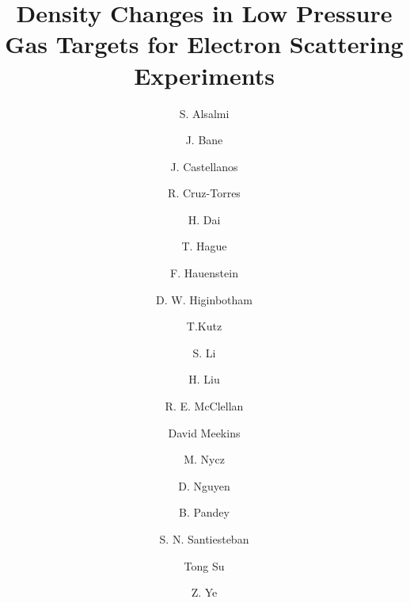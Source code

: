 \documentclass[final,5p,times,twocolumn,balance]{elsarticle}
\begin{document}
\begin{frontmatter}



\title{Density Changes in Low Pressure Gas Targets for Electron Scattering Experiments}

\author[Kent]{S. Alsalmi}
\author[TN]{J. Bane}
\author[FI]{J. Castellanos}
 \author[MIT]{R. Cruz-Torres}
\author[VT]{H. Dai}
\author[Kent]{T. Hague}
\author[OD]{F. Hauenstein}
\author[OD]{D. W. Higinbotham}
\author[SB]{T.Kutz}
\author[UNH]{S. Li}
\author[COL]{H. Liu}
\author[JLab]{R. E. McClellan}
\author[JLab]{David Meekins}
\author[Kent]{M. Nycz}
\author[UVa]{ D. Nguyen}
\author[hampton]{B. Pandey}
\author[UNH]{S. N. Santiesteban}
\author[Kent]{Tong Su}
\author[argonne]{ Z. Ye}


\address[Kent]{Kent State University, Kent, OH 44240}
\address[TN]{The University of Tennessee, Knoxville, Tennessee 37996, USA}
\address[FI]{Florida International University, Miami, FL
33199}
\address[MIT]{Massachusetts Institute of Technology, Cambridge, Massachusetts 02139, USA}
\address[UNH]{University of New Hampshire, Durham, NH 03824}
\address[VT]{Virginia Tech, Blacksburg, Virginia 24061}
\address[OD]{Old Dominion University, Norfolk, Virginia 23529, USA}
\address[COL]{Columbia University, New York, New York 10027, USA}
\address[JLab]{Jefferson Lab, Newport News, VA 23601}
\address[SB]{Stony Brook University, Stony Brook, New York 11794, USA}
\address[UVA]{Department of Physics, University of Virginia, Charlottesville, Virginia 22904, USA}
\address[hampton]{Hampton University, Hampton, Virginia 23669, USA}
\address[argonne]{Physics Division, Argonne National Laboratory, Argonne, Illinois 60439, USA}



\end{frontmatter}
\end{document}
